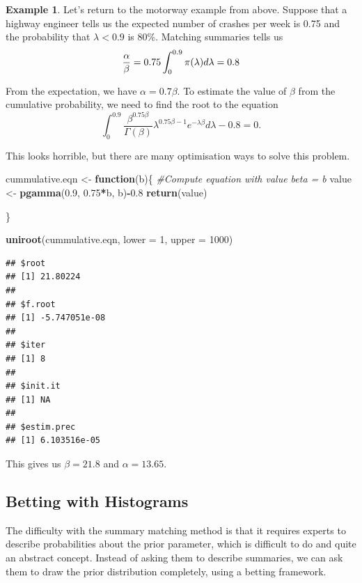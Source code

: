 \documentclass[
]{book}
\newenvironment{Shaded}{\begin{snugshade}}{\end{snugshade}}
\newcommand{\AttributeTok}[1]{\textcolor[rgb]{0.13,0.29,0.53}{#1}}
\newcommand{\CommentTok}[1]{\textcolor[rgb]{0.56,0.35,0.01}{\textit{#1}}}
\newcommand{\ControlFlowTok}[1]{\textcolor[rgb]{0.13,0.29,0.53}{\textbf{#1}}}
\newcommand{\DecValTok}[1]{\textcolor[rgb]{0.00,0.00,0.81}{#1}}
\newcommand{\FloatTok}[1]{\textcolor[rgb]{0.00,0.00,0.81}{#1}}
\newcommand{\FunctionTok}[1]{\textcolor[rgb]{0.13,0.29,0.53}{\textbf{#1}}}
\newcommand{\NormalTok}[1]{#1}
\newcommand{\OtherTok}[1]{\textcolor[rgb]{0.56,0.35,0.01}{#1}}
\newcommand{\SpecialCharTok}[1]{\textcolor[rgb]{0.81,0.36,0.00}{\textbf{#1}}}
\theoremstyle{definition}
\theoremstyle{definition}
\newtheorem{example}{Example}[chapter]
\theoremstyle{definition}
\theoremstyle{definition}
\theoremstyle{remark}
\begin{document}
\begin{example}
Let's return to the motorway example from above. Suppose that a highway engineer tells us the expected number of crashes per week is 0.75 and the probability that \(\lambda < 0.9\) is 80\%. Matching summaries tells us
\[
\frac{\alpha}{\beta} = 0.75 \\
\int_0^{0.9}\pi(\lambda) d\lambda = 0.8
\]

From the expectation, we have \(\alpha = 0.7\beta\). To estimate the value of \(\beta\) from the cumulative probability, we need to find the root to the equation
\[
\int_0^{0.9} \frac{\beta^{0.75\beta}}{\Gamma(\beta)}\lambda^{0.75\beta-1}e^{-\lambda\beta}d\lambda - 0.8 = 0. 
\]

This looks horrible, but there are many optimisation ways to solve this problem.

\begin{Shaded}
\begin{Highlighting}[]
\NormalTok{cummulative.eqn }\OtherTok{\textless{}{-}} \ControlFlowTok{function}\NormalTok{(b)\{}
  \CommentTok{\#Compute equation with value beta = b}
\NormalTok{  value }\OtherTok{\textless{}{-}} \FunctionTok{pgamma}\NormalTok{(}\FloatTok{0.9}\NormalTok{, }\FloatTok{0.75}\SpecialCharTok{*}\NormalTok{b, b)}\SpecialCharTok{{-}}\FloatTok{0.8}
  \FunctionTok{return}\NormalTok{(value)}
  
\NormalTok{\}}

\FunctionTok{uniroot}\NormalTok{(cummulative.eqn, }\AttributeTok{lower =} \DecValTok{1}\NormalTok{, }\AttributeTok{upper =} \DecValTok{1000}\NormalTok{)}
\end{Highlighting}
\end{Shaded}

\begin{verbatim}
## $root
## [1] 21.80224
## 
## $f.root
## [1] -5.747051e-08
## 
## $iter
## [1] 8
## 
## $init.it
## [1] NA
## 
## $estim.prec
## [1] 6.103516e-05
\end{verbatim}

This gives us \(\beta = 21.8\) and \(\alpha = 13.65\).
\end{example}

\hypertarget{betting-with-histograms}{%
\subsection{Betting with Histograms}\label{betting-with-histograms}}

The difficulty with the summary matching method is that it requires experts to describe probabilities about the prior parameter, which is difficult to do and quite an abstract concept. Instead of asking them to describe summaries, we can ask them to draw the prior distribution completely, using a betting framework.
\end{document}
